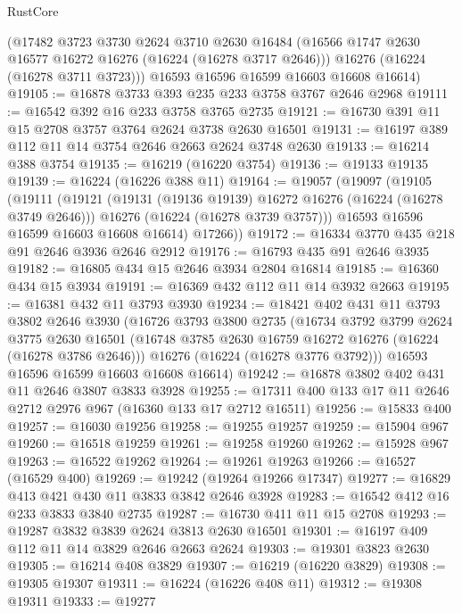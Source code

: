 \begin{lexlean}{RustCore}
\begin{coremodule}
      (@17482
        @3723
        @3730
        @2624
        @3710
        @2630
        @16484
        (@16566 @1747 @2630 @16577 @16272 @16276 (@16224 (@16278 @3717 @2646)))
        @16276
        (@16224 (@16278 @3711 @3723)))
      @16593
      @16596
      @16599
      @16603
      @16608
      @16614)
@19105 := @16878 @3733 @393 @235 @233 @3758 @3767 @2646 @2968
@19111 := @16542 @392 @16 @233 @3758 @3765 @2735
@19121 := @16730 @391 @11 @15 @2708 @3757 @3764 @2624 @3738 @2630 @16501
@19131 := @16197 @389 @112 @11 @14 @3754 @2646 @2663 @2624 @3748 @2630
@19133 := @16214 @388 @3754
@19135 := @16219 (@16220 @3754)
@19136 := @19133 @19135
@19139 := @16224 (@16226 @388 @11)
@19164 := @19057
    (@19097
      (@19105
        (@19111
          (@19121
            (@19131 (@19136 @19139) @16272 @16276 (@16224 (@16278 @3749 @2646)))
            @16276
            (@16224 (@16278 @3739 @3757)))
          @16593
          @16596
          @16599
          @16603
          @16608
          @16614)
        @17266))
@19172 := @16334 @3770 @435 @218 @91 @2646 @3936 @2646 @2912
@19176 := @16793 @435 @91 @2646 @3935
@19182 := @16805 @434 @15 @2646 @3934 @2804 @16814
@19185 := @16360 @434 @15 @3934
@19191 := @16369 @432 @112 @11 @14 @3932 @2663
@19195 := @16381 @432 @11 @3793 @3930
@19234 := @18421
    @402
    @431
    @11
    @3793
    @3802
    @2646
    @3930
    (@16726
      @3793
      @3800
      @2735
      (@16734
        @3792
        @3799
        @2624
        @3775
        @2630
        @16501
        (@16748 @3785 @2630 @16759 @16272 @16276 (@16224 (@16278 @3786 @2646)))
        @16276
        (@16224 (@16278 @3776 @3792)))
      @16593
      @16596
      @16599
      @16603
      @16608
      @16614)
@19242 := @16878 @3802 @402 @431 @11 @2646 @3807 @3833 @3928
@19255 := @17311 @400 @133 @17 @11 @2646 @2712 @2976 @967 (@16360 @133 @17 @2712 @16511)
@19256 := @15833 @400
@19257 := @16030 @19256
@19258 := @19255 @19257
@19259 := @15904 @967
@19260 := @16518 @19259
@19261 := @19258 @19260
@19262 := @15928 @967
@19263 := @16522 @19262
@19264 := @19261 @19263
@19266 := @16527 (@16529 @400)
@19269 := @19242 (@19264 @19266 @17347)
@19277 := @16829 @413 @421 @430 @11 @3833 @3842 @2646 @3928
@19283 := @16542 @412 @16 @233 @3833 @3840 @2735
@19287 := @16730 @411 @11 @15 @2708
@19293 := @19287 @3832 @3839 @2624 @3813 @2630 @16501
@19301 := @16197 @409 @112 @11 @14 @3829 @2646 @2663 @2624
@19303 := @19301 @3823 @2630
@19305 := @16214 @408 @3829
@19307 := @16219 (@16220 @3829)
@19308 := @19305 @19307
@19311 := @16224 (@16226 @408 @11)
@19312 := @19308 @19311
@19333 := @19277

\end{coremodule}
\end{lexlean}
